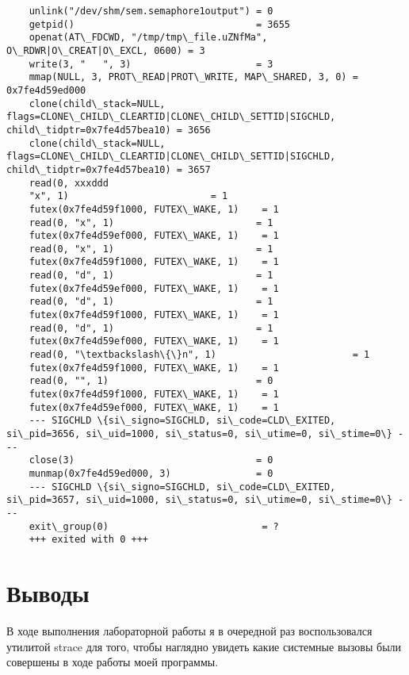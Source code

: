 \documentclass[a4paper, 12pt]{article}
\begin{document}
\begin{verbatim}
	unlink("/dev/shm/sem.semaphore1output") = 0
	getpid()                                = 3655
	openat(AT\_FDCWD, "/tmp/tmp\_file.uZNfMa", O\_RDWR|O\_CREAT|O\_EXCL, 0600) = 3
	write(3, "   ", 3)                      = 3
	mmap(NULL, 3, PROT\_READ|PROT\_WRITE, MAP\_SHARED, 3, 0) = 0x7fe4d59ed000
	clone(child\_stack=NULL, flags=CLONE\_CHILD\_CLEARTID|CLONE\_CHILD\_SETTID|SIGCHLD, child\_tidptr=0x7fe4d57bea10) = 3656
	clone(child\_stack=NULL, flags=CLONE\_CHILD\_CLEARTID|CLONE\_CHILD\_SETTID|SIGCHLD, child\_tidptr=0x7fe4d57bea10) = 3657
	read(0, xxxddd
	"x", 1)                         = 1
	futex(0x7fe4d59f1000, FUTEX\_WAKE, 1)    = 1
	read(0, "x", 1)                         = 1
	futex(0x7fe4d59ef000, FUTEX\_WAKE, 1)    = 1
	read(0, "x", 1)                         = 1
	futex(0x7fe4d59f1000, FUTEX\_WAKE, 1)    = 1
	read(0, "d", 1)                         = 1
	futex(0x7fe4d59ef000, FUTEX\_WAKE, 1)    = 1
	read(0, "d", 1)                         = 1
	futex(0x7fe4d59f1000, FUTEX\_WAKE, 1)    = 1
	read(0, "d", 1)                         = 1
	futex(0x7fe4d59ef000, FUTEX\_WAKE, 1)    = 1
	read(0, "\textbackslash\{\}n", 1)                        = 1
	futex(0x7fe4d59f1000, FUTEX\_WAKE, 1)    = 1
	read(0, "", 1)                          = 0
	futex(0x7fe4d59f1000, FUTEX\_WAKE, 1)    = 1
	futex(0x7fe4d59ef000, FUTEX\_WAKE, 1)    = 1
	--- SIGCHLD \{si\_signo=SIGCHLD, si\_code=CLD\_EXITED, si\_pid=3656, si\_uid=1000, si\_status=0, si\_utime=0, si\_stime=0\} ---
	close(3)                                = 0
	munmap(0x7fe4d59ed000, 3)               = 0
	--- SIGCHLD \{si\_signo=SIGCHLD, si\_code=CLD\_EXITED, si\_pid=3657, si\_uid=1000, si\_status=0, si\_utime=0, si\_stime=0\} ---
	exit\_group(0)                           = ?
	+++ exited with 0 +++

\end{verbatim}
\newpage
\section{Выводы}

В ходе выполнения лабораторной работы я в очередной раз воспользовался утилитой strace для того, чтобы наглядно увидеть какие системные вызовы были совершены в ходе работы моей программы.
\end{document}
